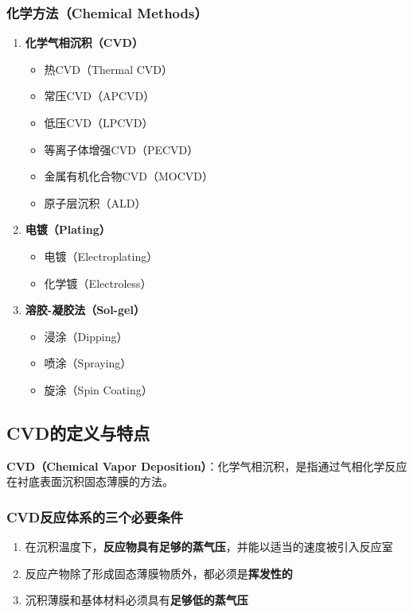 \documentclass[UTF8,12pt,a4paper]{ctexart}
\begin{document}
\subsubsection{化学方法（Chemical Methods）}

\begin{enumerate}
    \item \textbf{化学气相沉积（CVD）}
    \begin{itemize}
        \item 热CVD（Thermal CVD）
        \item 常压CVD（APCVD）
        \item 低压CVD（LPCVD）
        \item 等离子体增强CVD（PECVD）
        \item 金属有机化合物CVD（MOCVD）
        \item 原子层沉积（ALD）
    \end{itemize}
    
    \item \textbf{电镀（Plating）}
    \begin{itemize}
        \item 电镀（Electroplating）
        \item 化学镀（Electroless）
    \end{itemize}
    
    \item \textbf{溶胶-凝胶法（Sol-gel）}
    \begin{itemize}
        \item 浸涂（Dipping）
        \item 喷涂（Spraying）
        \item 旋涂（Spin Coating）
    \end{itemize}
\end{enumerate}

\subsection{CVD的定义与特点}

\textbf{CVD（Chemical Vapor Deposition）}：化学气相沉积，是指通过气相化学反应在衬底表面沉积固态薄膜的方法。

\subsubsection{CVD反应体系的三个必要条件}

\begin{enumerate}
    \item 在沉积温度下，\textbf{反应物具有足够的蒸气压}，并能以适当的速度被引入反应室
    \item 反应产物除了形成固态薄膜物质外，都必须是\textbf{挥发性的}
    \item 沉积薄膜和基体材料必须具有\textbf{足够低的蒸气压}
\end{enumerate}
\end{document}
